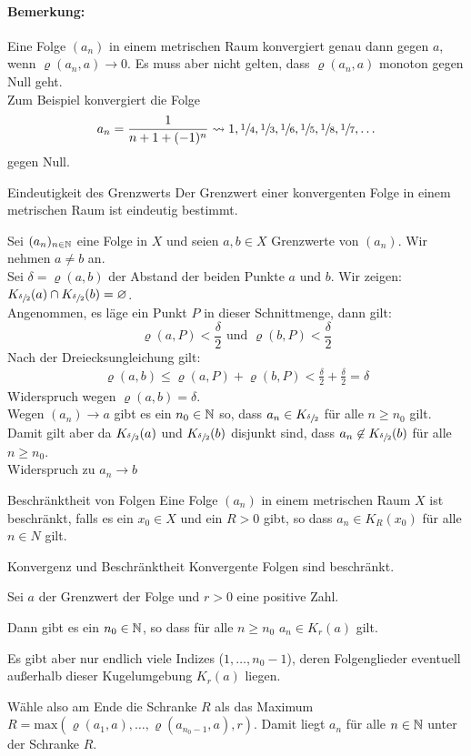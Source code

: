\paragraph{Bemerkung:}
Eine Folge $(a_n)$ in einem metrischen Raum konvergiert genau dann gegen $a$, wenn $\varrho(a_n,a)\rightarrow 0$. Es muss aber nicht gelten, dass $\varrho(a_n,a)$ monoton gegen Null geht.\\
Zum Beispiel konvergiert die Folge
\begin{equation*}
	a_n=\frac{1}{n+1+(-1)^n} \rightsquigarrow 1,\sfrac14,\sfrac13,\sfrac16,\sfrac15,\sfrac18,\sfrac17,\ldots
\end{equation*}
gegen Null.


\begin{satz}{Eindeutigkeit des Grenzwerts}
	Der Grenzwert einer konvergenten Folge in einem metrischen Raum ist eindeutig bestimmt.
\end{satz}
\beweis
Sei $(a_n)_{n\in\mathbb{N}}$ eine Folge in $X$ und seien $a,b\in X$ Grenzwerte von $(a_n)$. Wir nehmen $a\neq b$ an.\\
Sei $\delta=\varrho(a,b)$ der Abstand der beiden Punkte $a$ und $b$. Wir zeigen: $K_{\sfrac{\delta}{2}}(a)\cap K_{\sfrac{\delta}{2}}(b)=\varnothing$.\\
Angenommen, es läge ein Punkt $P$ in dieser Schnittmenge, dann gilt:
\begin{equation*}
	\varrho(a,P)<\frac\delta2 \text{ und } \varrho(b,P)<\frac\delta2
\end{equation*}
Nach der Dreiecksungleichung gilt:
\begin{align*}
	\varrho(a,b)\leq \varrho(a,P) + \varrho(b,P) < \frac\delta2 + \frac\delta2 = \delta
\end{align*}
Widerspruch wegen $\varrho(a,b)=\delta$.\\
Wegen $(a_n)\rightarrow a$ gibt es ein $n_0\in\mathbb{N}$ so, dass $a_n\in K_{\sfrac\delta2}$ für alle $n\geq n_0$ gilt.\\
Damit gilt aber da $K_{\sfrac{\delta}{2}}(a)$ und $K_{\sfrac{\delta}{2}}(b)$ disjunkt sind, dass $a_n\not\in K_{\sfrac{\delta}{2}}(b)$ für alle $n\geq n_0$.\\
Widerspruch zu $a_n\rightarrow b$

\begin{definition}{Beschränktheit von Folgen}
	Eine Folge $(a_n)$ in einem metrischen Raum $X$ ist beschränkt, falls es ein $x_0\in X$ und ein $R>0$ gibt, so dass $a_n\in K_R(x_0)$ für alle $n\in N$ gilt.
\end{definition}
\begin{satz}{Konvergenz und Beschränktheit}
	Konvergente Folgen sind beschränkt.
\end{satz}
\beweis
Sei $a$ der Grenzwert der Folge und $r>0$ eine positive Zahl.

Dann gibt es ein $n_0\in\mathbb{N}$, so dass für alle $n\geq n_0$ $a_n\in K_r(a)$ gilt.

Es gibt aber nur endlich viele Indizes ($1,\ldots,n_0-1$), deren Folgenglieder eventuell außerhalb dieser Kugelumgebung $K_r(a)$ liegen.

Wähle also am Ende die Schranke $R$ als das Maximum $R=\mathrm{max}(\varrho(a_1,a),\ldots,\varrho(a_{n_0-1},a),r)$. Damit liegt $a_n$ für alle $n\in\mathbb{N}$ unter der Schranke $R$.
